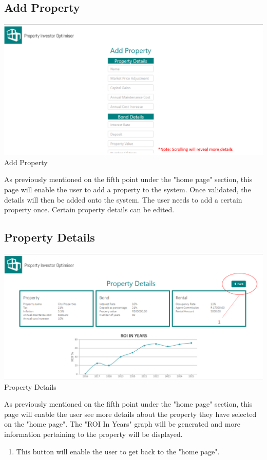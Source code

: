 \documentclass[a4paper,12pt]{article}
\begin{document}
\subsection{Add Property}
		\includegraphics[width=0.9\linewidth, center]{./System/AddProperty.PNG}\\[0.4cm]  
		\caption{Add Property}
As previously mentioned on the fifth point under the "home page" section, this page will enable the user to add a property to the system. Once validated, the details will then be added onto the system. The user needs to add a certain property once. Certain property details can be edited.  

\subsection{Property Details}
		\includegraphics[width=0.9\linewidth, center]{./System/PropertyDetails.PNG}\\[0.4cm]  
		\caption{Property Details}
	As previously mentioned on the fifth point under the "home page" section, this page will enable the user see more details 			about the property they have selected on the "home page". The "ROI In Years" graph will be generated and more information 			pertaining to the property will be displayed.  
	\begin{enumerate}
		\item This button will enable the user to get back to the "home page".
	\end{enumerate}
\end{document}
